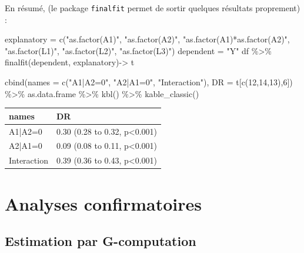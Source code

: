 \documentclass[
]{book}
\newenvironment{Shaded}{\begin{snugshade}}{\end{snugshade}}
\newcommand{\AttributeTok}[1]{\textcolor[rgb]{0.77,0.63,0.00}{#1}}
\newcommand{\DecValTok}[1]{\textcolor[rgb]{0.00,0.00,0.81}{#1}}
\newcommand{\FunctionTok}[1]{\textcolor[rgb]{0.00,0.00,0.00}{#1}}
\newcommand{\NormalTok}[1]{#1}
\newcommand{\OtherTok}[1]{\textcolor[rgb]{0.56,0.35,0.01}{#1}}
\newcommand{\SpecialCharTok}[1]{\textcolor[rgb]{0.00,0.00,0.00}{#1}}
\newcommand{\StringTok}[1]{\textcolor[rgb]{0.31,0.60,0.02}{#1}}
\begin{document}
En résumé, (le package \texttt{finalfit} permet de sortir quelques résultats proprement) :

\begin{Shaded}
\begin{Highlighting}[]
\NormalTok{explanatory }\OtherTok{=} \FunctionTok{c}\NormalTok{(}\StringTok{"as.factor(A1)"}\NormalTok{,}
                \StringTok{"as.factor(A2)"}\NormalTok{,}
                \StringTok{"as.factor(A1)*as.factor(A2)"}\NormalTok{, }
                \StringTok{"as.factor(L1)"}\NormalTok{,}
                \StringTok{"as.factor(L2)"}\NormalTok{, }
                \StringTok{"as.factor(L3)"}\NormalTok{)}
\NormalTok{dependent }\OtherTok{=} \StringTok{"Y"}
\NormalTok{df }\SpecialCharTok{\%\textgreater{}\%}
  \FunctionTok{finalfit}\NormalTok{(dependent, explanatory)}\OtherTok{{-}\textgreater{}}\NormalTok{ t}

\FunctionTok{cbind}\NormalTok{(}\AttributeTok{names =} \FunctionTok{c}\NormalTok{(}\StringTok{"A1|A2=0"}\NormalTok{, }\StringTok{"A2|A1=0"}\NormalTok{, }\StringTok{"Interaction"}\NormalTok{), }\AttributeTok{DR =}\NormalTok{ t[}\FunctionTok{c}\NormalTok{(}\DecValTok{12}\NormalTok{,}\DecValTok{14}\NormalTok{,}\DecValTok{13}\NormalTok{),}\DecValTok{6}\NormalTok{]) }\SpecialCharTok{\%\textgreater{}\%}
\NormalTok{  as.data.frame }\SpecialCharTok{\%\textgreater{}\%} 
      \FunctionTok{kbl}\NormalTok{() }\SpecialCharTok{\%\textgreater{}\%}
      \FunctionTok{kable\_classic}\NormalTok{() }
\end{Highlighting}
\end{Shaded}

\begin{table}
\centering
\begin{tabular}[t]{l|l}
\hline
names & DR\\
\hline
A1|A2=0 & 0.30 (0.28 to 0.32, p<0.001)\\
\hline
A2|A1=0 & 0.09 (0.08 to 0.11, p<0.001)\\
\hline
Interaction & 0.39 (0.36 to 0.43, p<0.001)\\
\hline
\end{tabular}
\end{table}

\hypertarget{conf}{%
\chapter{Analyses confirmatoires}\label{conf}}

\hypertarget{estimation-par-g-computation}{%
\section{Estimation par G-computation}\label{estimation-par-g-computation}}
\end{document}
